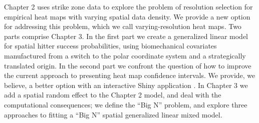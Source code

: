 
Chapter 2 uses strike zone data to explore the problem of resolution selection for empirical heat maps with varying spatial data density. We provide a new option for addressing this problem, which we call varying-resolution heat maps. Two parts comprise Chapter 3. In the first part we create a generalized linear model for spatial hitter success probabilities, using biomechanical covariates manufactured from a switch to the polar coordinate system and a strategically translated origin. In the second part we confront the question of how to improve the current approach to presenting heat map confidence intervals. We provide, we believe, a better option with an interactive Shiny application \citep{Shiny}. In Chapter 3 we add a spatial random effect to the Chapter 2 model, and deal with the computational consequences; we define the ``Big N'' problem, and explore three approaches to fitting a ``Big N'' spatial generalized linear mixed model. 
